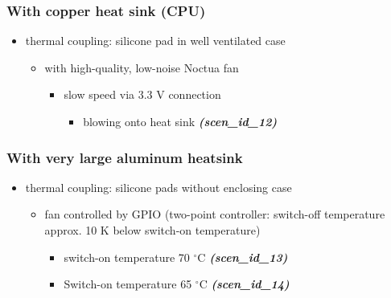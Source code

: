 \documentclass[10pt,parskip=half,
toc=sectionentrywithdots,
bibliography=totocnumbered,
captions=tableheading,numbers=noendperiod]{scrartcl}
\providecommand{\tightlist}{%
  \setlength{\itemsep}{0pt}\setlength{\parskip}{0pt}}
\begin{document}
\hypertarget{with-copper-heat-sink-cpu}{%
\subsubsection{With copper heat sink
(CPU)}\label{with-copper-heat-sink-cpu}}

\begin{itemize}
\tightlist
\item
  thermal coupling: silicone pad in well ventilated case

  \begin{itemize}
  \tightlist
  \item
    with high-quality, low-noise Noctua fan

    \begin{itemize}
    \tightlist
    \item
      slow speed via 3.3 V connection

      \begin{itemize}
      \tightlist
      \item
        blowing onto heat sink \textbf{\emph{(scen\_id\_12)}}
      \end{itemize}
    \end{itemize}
  \end{itemize}
\end{itemize}

\hypertarget{with-very-large-aluminum-heatsink}{%
\subsubsection{With very large aluminum
heatsink}\label{with-very-large-aluminum-heatsink}}

\begin{itemize}
\tightlist
\item
  thermal coupling: silicone pads without enclosing case

  \begin{itemize}
  \tightlist
  \item
    fan controlled by GPIO (two-point controller: switch-off temperature
    approx. 10 K below switch-on temperature)

    \begin{itemize}
    \tightlist
    \item
      switch-on temperature 70 \(^\circ\)C
      \textbf{\emph{(scen\_id\_13)}}
    \item
      Switch-on temperature 65 \(^\circ\)C
      \textbf{\emph{(scen\_id\_14)}}
    \end{itemize}
  \end{itemize}
\end{itemize}
\end{document}
